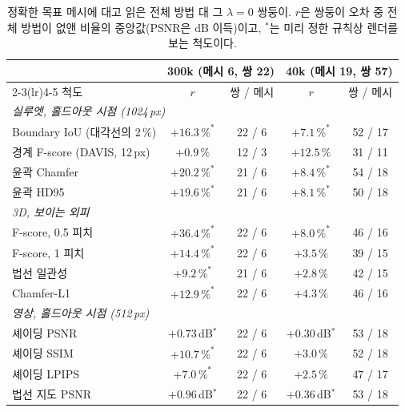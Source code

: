 \begin{table}[t]
\centering
\footnotesize
\setlength{\tabcolsep}{4pt}
\caption{정확한 목표 메시에 대고 읽은 전체 방법 대 그 $\lambda=0$ 쌍둥이. \textmd{$r$은 쌍둥이 오차 중 전체 방법이 없앤 비율의
중앙값(PSNR은 dB 이득)이고, $^\ast$는 미리 정한 규칙상 렌더를 보는 척도이다.}}
\label{ch4:tab_d157_ko}
\begin{tabular}{lcccc}
\toprule
 & \multicolumn{2}{c}{300k (메시 6, 쌍 22)} & \multicolumn{2}{c}{40k (메시 19, 쌍 57)} \\
\cmidrule(lr){2-3}\cmidrule(lr){4-5}
척도 & $r$ & 쌍 / 메시 & $r$ & 쌍 / 메시 \\
\midrule
\multicolumn{5}{l}{\textit{실루엣, 홀드아웃 시점 (1024\,px)}}\\
Boundary IoU (대각선의 2\,\%)          & $+16.3\,\%^\ast$ & 22 / 6 & $+7.1\,\%^\ast$ & 52 / 17 \\
경계 F-score (DAVIS, 12\,px)            & $+0.9\,\%$       & 12 / 3 & $+12.5\,\%$      & 31 / 11 \\
윤곽 Chamfer                            & $+20.2\,\%^\ast$ & 21 / 6 & $+8.4\,\%^\ast$  & 54 / 18 \\
윤곽 HD95                               & $+19.6\,\%^\ast$ & 21 / 6 & $+8.1\,\%^\ast$  & 50 / 18 \\
\multicolumn{5}{l}{\textit{3D, 보이는 외피}}\\
F-score, 0.5 피치                       & $+36.4\,\%^\ast$ & 22 / 6 & $+8.0\,\%^\ast$  & 46 / 16 \\
F-score, 1 피치                         & $+14.4\,\%^\ast$ & 22 / 6 & $+3.5\,\%$       & 39 / 15 \\
법선 일관성                             & $+9.2\,\%^\ast$  & 21 / 6 & $+2.8\,\%$       & 42 / 15 \\
Chamfer-L1                              & $+12.9\,\%^\ast$ & 22 / 6 & $+4.3\,\%$       & 46 / 16 \\
\multicolumn{5}{l}{\textit{영상, 홀드아웃 시점 (512\,px)}}\\
셰이딩 PSNR                             & $+0.73$\,dB$^\ast$ & 22 / 6 & $+0.30$\,dB$^\ast$ & 53 / 18 \\
셰이딩 SSIM                             & $+10.7\,\%^\ast$ & 22 / 6 & $+3.0\,\%$       & 52 / 18 \\
셰이딩 LPIPS                            & $+7.0\,\%^\ast$  & 22 / 6 & $+2.5\,\%$       & 47 / 17 \\
법선 지도 PSNR                          & $+0.96$\,dB$^\ast$ & 22 / 6 & $+0.36$\,dB$^\ast$ & 53 / 18 \\

\end{tabular}
\end{table}
